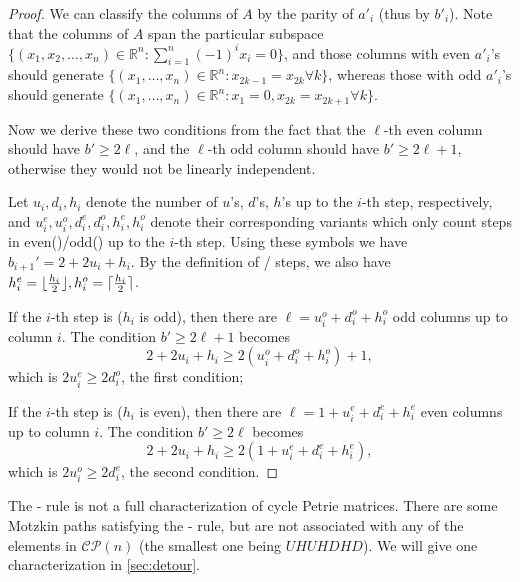 \documentclass[pdflatex,sn-mathphys-num]{sn-jnl}%
\theoremstyle{thmstyleone}%
\theoremstyle{thmstyletwo}%
\theoremstyle{thmstylethree}%
\numberwithin{equation}{section}
\newcommand{\R}{\mathbb{R}}
\DeclarePairedDelimiter{\floor}{\lfloor}{\rfloor}
\DeclarePairedDelimiter{\ceil}{\lceil}{\rceil}
\begin{document}
        \begin{proof}
            We can classify the columns of $A$ by the parity of $a'_i$ (thus by $b'_i$). Note that the columns of $A$ span the particular subspace $\{(x_1,x_2,\dotsc,x_n)\in \R^n: \sum_{i=1}^n (-1)^i x_i=0\}$, and those columns with even $a'_i$'s should generate $\{(x_1,\dotsc,x_n)\in \R^n: x_{2k-1}=x_{2k} \forall k\}$, whereas those with odd $a'_i$'s should generate $\{(x_1,\dotsc,x_n)\in \R^n: x_1=0, x_{2k}=x_{2k+1} \forall k\}$.
        
            Now we derive these two conditions from the fact that the $\ell$-th even column should have $b'\geq 2\ell$, and the $\ell$-th odd column should have $b'\geq 2\ell+1$, otherwise they would not be linearly independent. 

            Let $u_i,d_i,h_i$ denote the number of $u$'s, $d$'s, $h$'s up to the $i$-th step, respectively, and $u_i^e,u_i^o,d_i^e,d_i^o,h_i^e,h_i^o$ denote their corresponding variants which only count steps in even(\blue)/odd(\red) up to the $i$-th step. 
            Using these symbols we have $b_{i+1}' =2+2u_i+h_i$. 
            By the definition of \blue/\red{} steps, we also have $h_i^e=\floor{\frac{h_i}{2}}, h_i^o=\ceil{\frac{h_i}{2}}$.

            If the $i$-th step is \red{} ($h_i$ is odd), then there are $\ell=u_i^o+d_i^o+h_i^o$ odd columns up to column $i$. The condition $b'\geq 2\ell+1$ becomes
            \[2+2u_i+h_i \geq 2(u_i^o+d_i^o+h_i^o)+1,\]
            which is $2u_i^e \geq 2d_i^o$, the first condition;
            
            If the $i$-th step is \blue{} ($h_i$ is even), then there are $\ell=1+u_i^e+d_i^e+h_i^e$ even columns up to column $i$. The condition $b'\geq 2\ell$ becomes 
            \[2+2u_i+h_i \geq 2(1+u_i^e+d_i^e+h_i^e),\]
            which is $2u_i^o\geq 2d_i^e$, the second condition.
        \end{proof}
        
            The \red-\blue{} rule is not a full characterization of cycle Petrie matrices. There are some Motzkin paths satisfying the \red-\blue{} rule, but are not associated with any of the elements in $\mathcal{CP}(n)$ (the smallest one being $UHUHDHD$). We will give one characterization in \cref{sec:detour}.
        
\end{document}
